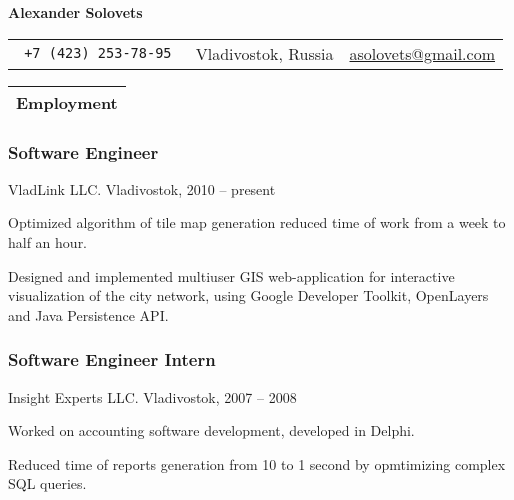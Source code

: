 \documentclass[a4paper]{article}
\def\name{Alexander Solovets}
\begin{document}
\color{dark-gray}
\sf

\begin{center}
	{\Huge \bfseries \name}
	\vskip 4pt
	\begin{tabular}{r|c|r}
		\tt
		+7 (423) 253-78-95 & Vladivostok, Russia & \href{mailto:asolovets@gmail.com}{asolovets@gmail.com}\\
	\end{tabular}
\end{center}

\small

	\begin{tabularx}{\textwidth}{@{}X}
		\textbf{\color{black}\large Employment}\\
		\hline
	\end{tabularx}
		\begin{multicols}{2}
			\raggedcolumns
			\subsubsection*{Software Engineer}
			{\color{black}VladLink LLC. Vladivostok, 2010 -- present}
			\begin{items}
				\item Optimized algorithm of tile map generation reduced time of work from a week to half an hour.
				\item Designed and implemented multiuser GIS web-application for interactive visualization of the city network, using Google Developer Toolkit, OpenLayers and Java Persistence API.
			\end{items}

			\columnbreak

			\subsubsection*{Software Engineer Intern}
			{\color{black}Insight Experts LLC. Vladivostok, 2007 -- 2008}
			\begin{items}
				\item Worked on accounting software development, developed in Delphi.
				\item Reduced time of reports generation from 10 to 1 second by opmtimizing complex SQL queries.
			\end{items}
		\end{multicols}
\end{document}
